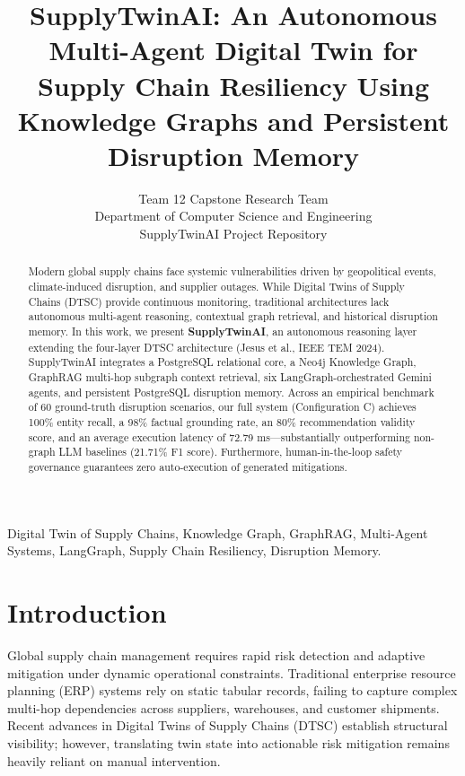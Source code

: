 \documentclass[journal]{IEEEtran}
\begin{document}
\title{SupplyTwinAI: An Autonomous Multi-Agent Digital Twin for Supply Chain Resiliency Using Knowledge Graphs and Persistent Disruption Memory}

\author{Team 12 Capstone Research Team\\
Department of Computer Science and Engineering\\
SupplyTwinAI Project Repository}

\maketitle

\begin{abstract}
Modern global supply chains face systemic vulnerabilities driven by geopolitical events, climate-induced disruption, and supplier outages. While Digital Twins of Supply Chains (DTSC) provide continuous monitoring, traditional architectures lack autonomous multi-agent reasoning, contextual graph retrieval, and historical disruption memory. In this work, we present \textbf{SupplyTwinAI}, an autonomous reasoning layer extending the four-layer DTSC architecture (Jesus et al., IEEE TEM 2024). SupplyTwinAI integrates a PostgreSQL relational core, a Neo4j Knowledge Graph, GraphRAG multi-hop subgraph context retrieval, six LangGraph-orchestrated Gemini agents, and persistent PostgreSQL disruption memory. Across an empirical benchmark of 60 ground-truth disruption scenarios, our full system (Configuration C) achieves 100\% entity recall, a 98\% factual grounding rate, an 80\% recommendation validity score, and an average execution latency of 72.79 ms---substantially outperforming non-graph LLM baselines (21.71\% F1 score). Furthermore, human-in-the-loop safety governance guarantees zero auto-execution of generated mitigations.
\end{abstract}

\begin{IEEEkeywords}
Digital Twin of Supply Chains, Knowledge Graph, GraphRAG, Multi-Agent Systems, LangGraph, Supply Chain Resiliency, Disruption Memory.
\end{IEEEkeywords}

\section{Introduction}
Global supply chain management requires rapid risk detection and adaptive mitigation under dynamic operational constraints. Traditional enterprise resource planning (ERP) systems rely on static tabular records, failing to capture complex multi-hop dependencies across suppliers, warehouses, and customer shipments. Recent advances in Digital Twins of Supply Chains (DTSC) establish structural visibility; however, translating twin state into actionable risk mitigation remains heavily reliant on manual intervention.
\end{document}

